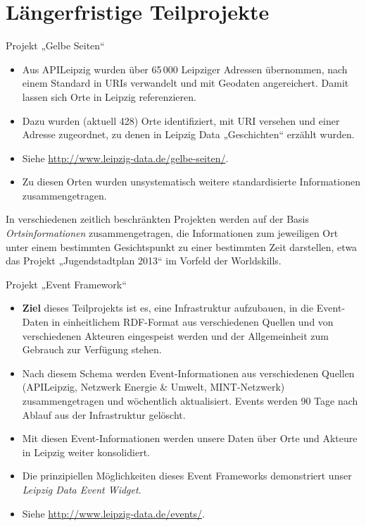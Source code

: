 \documentclass{beamer}
\begin{document}
\section{Längerfristige Teilprojekte}
\begin{frame}{Projekt „Gelbe Seiten“}{}\small
  \begin{itemize}
  \item Aus APILeipzig wurden über 65\,000 Leipziger Adressen übernommen, nach
    einem Standard in URIs verwandelt und mit Geodaten angereichert. Damit
    lassen sich Orte in Leipzig referenzieren.
  \item Dazu wurden (aktuell 428) Orte identifiziert, mit URI versehen und
    einer Adresse zugeordnet, zu denen in Leipzig Data „Geschichten“ erzählt
    wurden.
  \item Siehe \url{http://www.leipzig-data.de/gelbe-seiten/}.
  \item Zu diesen Orten wurden unsystematisch weitere standardisierte
    Informationen zusammengetragen.
  \end{itemize}
In verschiedenen zeitlich beschränkten Projekten werden auf der Basis
\emph{Ortsinformationen} zusammengetragen, die Informationen zum jeweiligen Ort
unter einem bestimmten Gesichtspunkt zu einer bestimmten Zeit darstellen, etwa
das Projekt „Jugendstadtplan 2013“ im Vorfeld der Worldskills. 
\end{frame}

\begin{frame}{Projekt „Event Framework“}{}\small
  \begin{itemize}
  \item \textbf{Ziel} dieses Teilprojekts ist es, eine Infrastruktur
    aufzubauen, in die Event-Daten in einheitlichem RDF-Format aus
    verschiedenen Quellen und von verschiedenen Akteuren eingespeist werden und
    der Allgemeinheit zum Gebrauch zur Verfügung stehen.
  \item Nach diesem Schema werden Event-Informationen aus verschiedenen Quellen
    (APILeipzig, Netzwerk Energie \& Umwelt, MINT-Netzwerk) zusammengetragen
    und wöchentlich aktualisiert. Events werden 90 Tage nach Ablauf aus der
    Infrastruktur gelöscht.
  \item Mit diesen Event-Informationen werden unsere Daten über Orte und
    Akteure in Leipzig weiter konsolidiert.
  \item Die prinzipiellen Möglichkeiten dieses Event Frameworks demonstriert
    unser \emph{Leipzig Data Event Widget}.
  \item Siehe \url{http://www.leipzig-data.de/events/}.
  \end{itemize}
\end{frame}
\end{document}
